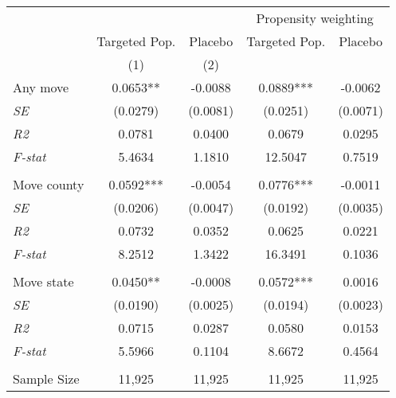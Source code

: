 \begin{tabular}{lcccc}
\toprule
\toprule
 & & & \multicolumn{2}{c}{Propensity weighting}  \\
 & Targeted Pop. & Placebo & Targeted Pop. & Placebo \\
 & (1) & (2)  \\
\midrule 
 Any move & 0.0653** & -0.0088 & 0.0889*** & -0.0062 \\
 \textit{SE} & (0.0279) & (0.0081) & (0.0251) & (0.0071) \\
 \textit{R2} & 0.0781 & 0.0400 & 0.0679 & 0.0295  \\
 \textit{F-stat} & 5.4634 & 1.1810 & 12.5047 & 0.7519  \\
\\
 Move county & 0.0592*** & -0.0054 & 0.0776*** & -0.0011 \\
 \textit{SE} & (0.0206) & (0.0047) & (0.0192) & (0.0035) \\
 \textit{R2} & 0.0732 & 0.0352 & 0.0625 & 0.0221  \\
 \textit{F-stat} & 8.2512 & 1.3422 & 16.3491 & 0.1036  \\
\\
 Move state & 0.0450** & -0.0008 & 0.0572*** & 0.0016 \\
 \textit{SE} & (0.0190) & (0.0025) & (0.0194) & (0.0023) \\
 \textit{R2} & 0.0715 & 0.0287 & 0.0580 & 0.0153  \\
 \textit{F-stat} & 5.5966 & 0.1104 & 8.6672 & 0.4564  \\
\\
Sample Size  & 11,925  & 11,925  & 11,925  & 11,925 \\
\bottomrule
\bottomrule
\end{tabular}